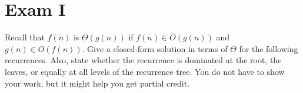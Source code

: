 \chapter{Exam I}
\label{ch:exam1}

\begin{gram}
Recall that $f(n)$ is $\Theta(g(n))$
if $f(n) \in O(g(n))$ and $g(n) \in O(f(n))$.
Give a closed-form
solution in terms of $\Theta$ for the following recurrences.
Also, state whether the recurrence is dominated at the root, the
leaves, or equally at all levels of the recurrence tree.
You do not have to show your work, but it might help you get partial
credit.
\end{gram}

